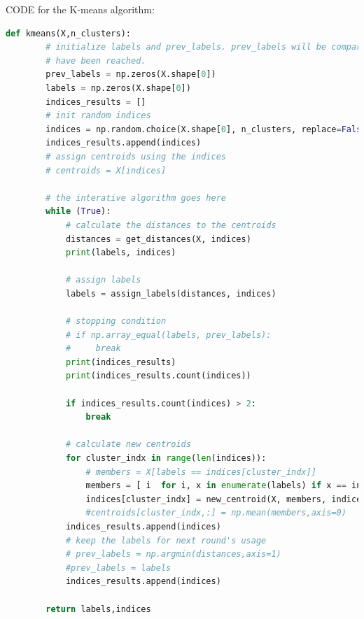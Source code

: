 \documentclass{article}
\begin{document}
CODE for the K-means algorithm:

\begin{lstlisting}[language=Python, caption= K-Means Algorithm, label={lst:K-Means implementation}]
    def kmeans(X,n_clusters):
        # initialize labels and prev_labels. prev_labels will be compared with labels to check if the stopping condition
        # have been reached.
        prev_labels = np.zeros(X.shape[0])
        labels = np.zeros(X.shape[0])
        indices_results = []
        # init random indices
        indices = np.random.choice(X.shape[0], n_clusters, replace=False)
        indices_results.append(indices)
        # assign centroids using the indices
        # centroids = X[indices]
        
        # the interative algorithm goes here
        while (True):
            # calculate the distances to the centroids
            distances = get_distances(X, indices)
            print(labels, indices)
    
            # assign labels
            labels = assign_labels(distances, indices)
            
            # stopping condition
            # if np.array_equal(labels, prev_labels):
            #     break
            print(indices_results)
            print(indices_results.count(indices))
    
            if indices_results.count(indices) > 2:
                break
            
            # calculate new centroids
            for cluster_indx in range(len(indices)):
                # members = X[labels == indices[cluster_indx]]
                members = [ i  for i, x in enumerate(labels) if x == indices[cluster_indx]]
                indices[cluster_indx] = new_centroid(X, members, indices)
                #centroids[cluster_indx,:] = np.mean(members,axis=0)
            indices_results.append(indices)
            # keep the labels for next round's usage
            # prev_labels = np.argmin(distances,axis=1)
            #prev_labels = labels
            indices_results.append(indices)
        
        return labels,indices
        
    \end{lstlisting}
\end{document}
